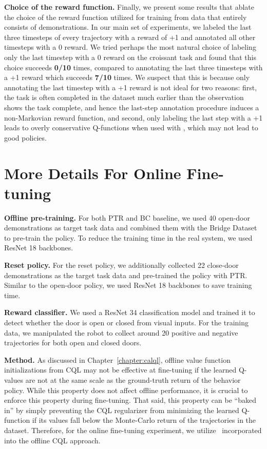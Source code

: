 \documentclass[../thesis.tex]{subfiles}
\begin{document}
\textbf{Choice of the reward function.} Finally, we present some results that ablate the choice of the reward function utilized for training \ptrmethodname from data that entirely consists of demonstrations. In our main set of experiments, we labeled the last three timesteps of every trajectory with a reward of +1 and annotated all other timesteps with a 0 reward. We tried perhaps the most natural choice of labeling only the last timestep with a 0 reward on the croissant task and found that this choice succeeds \textbf{0/10} times, compared to annotating the last three timesteps with a +1 reward which succeeds \textbf{7/10} times. We suspect that this is because only annotating the last timestep with a +1 reward is not ideal for two reasons: first, the task is often completed in the dataset much earlier than the observation shows the task complete, and hence the last-step annotation procedure induces a non-Markovian reward function, and second, only labeling the last step with a +1 leads to overly conservative Q-functions when used with \ptrmethodname, which may not lead to good policies.

\section{More Details For Online Fine-tuning}
\label{app:online_finetuning}

\textbf{Offline pre-training.}
For both PTR and BC baseline, we used 40 open-door demonstrations as target task data and combined them with the Bridge Dataset to pre-train the policy. To reduce the training time in the real system, we used ResNet 18 backbones.

\textbf{Reset policy.}
For the reset policy, we additionally collected 22 close-door demonstrations as the target task data and pre-trained the policy with PTR. Similar to the open-door policy, we used ResNet 18 backbones to save training time.

\textbf{Reward classifier.} We used a ResNet 34 classification model and trained it to detect whether the door is open or closed from visual inputs. For the training data, we manipulated the robot to collect around 20 positive and negative trajectories for both open and closed doors.

\textbf{Method.} As discussed in Chapter~\ref{chapter:calql}, offline value function initializations from CQL may not be effective at fine-tuning if the learned Q-values are not at the same scale as the ground-truth return of the behavior policy. While this property does not affect offline performance, it is crucial to enforce this property during fine-tuning. That said, this property can be ``baked in'' by simply preventing the CQL regularizer from minimizing the learned Q-function if its values fall below the Monte-Carlo return of the trajectories in the dataset. Therefore, for the online fine-tuning experiment, we utilize \methodname\ incorporated into the offline CQL approach.
\end{document}
